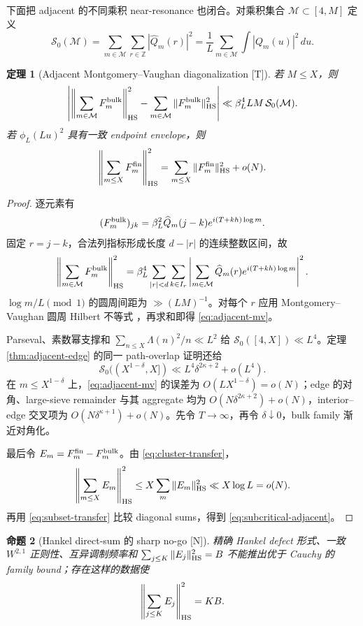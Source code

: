 \documentclass[UTF8,11pt,a4paper]{ctexart}
\newtheorem{theorem}{定理}[section]
\newtheorem{proposition}[theorem]{命题}
\theoremstyle{definition}
\theoremstyle{remark}
\begin{document}
下面把 adjacent 的不同乘积 near-resonance 也闭合。对乘积集合
$\mathcal M\subset[4,M]$ 定义
\[
 \mathcal S_0(\mathcal M)
 =\sum_{m\in\mathcal M}\sum_{r\in\mathbb Z}|\widehat Q_m(r)|^2
 =\frac1L\sum_{m\in\mathcal M}\int|Q_m(u)|^2\,du.
\]

\begin{theorem}[Adjacent Montgomery--Vaughan diagonalization {[T]}]
\label{thm:adjacent-mv}
若 $M\le X$，则
\[
 \left|
 \left\|\sum_{m\in\mathcal M}F_m^{\rm bulk}\right\|_{\rm HS}^2
 -\sum_{m\in\mathcal M}\|F_m^{\rm bulk}\|_{\rm HS}^2
 \right|
 \ll \beta_L^4LM\,\mathcal S_0(\mathcal M).
 \label{eq:adjacent-mv}
\]
若 $\phi_L(Lu)^2$ 具有一致 endpoint envelope，则
\[
 \left\|\sum_{m\le X}F_m^{\rm fin}\right\|_{\rm HS}^2
 =
 \sum_{m\le X}\|F_m^{\rm fin}\|_{\rm HS}^2+o(N).
 \label{eq:subcritical-adjacent}
\]
\end{theorem}

\begin{proof}
逐元素有
\[
 (F_m^{\rm bulk})_{jk}
 =\beta_L^2\widehat Q_m(j-k)e^{i(T+kh)\log m}.
\]
固定 $r=j-k$，合法列指标形成长度 $d-|r|$ 的连续整数区间，故
\[
 \left\|\sum_{m\in\mathcal M}F_m^{\rm bulk}\right\|_{\rm HS}^2
 =
 \beta_L^4\sum_{|r|<d}\sum_{k\in I_r}
 \left|\sum_{m\in\mathcal M}
 \widehat Q_m(r)e^{i(T+kh)\log m}\right|^2.
\]
$\log m/L\pmod1$ 的圆周间距为 $\gg(LM)^{-1}$。对每个 $r$ 应用
Montgomery--Vaughan 圆周 Hilbert 不等式 \cite{MV74}，再求和即得
\eqref{eq:adjacent-mv}。

Parseval、素数幂支撑和
$\sum_{n\le X}\Lambda(n)^2/n\ll L^2$ 给
$\mathcal S_0([4,X])\ll L^4$。定理 \ref{thm:adjacent-edge} 的同一
path-overlap 证明还给
\[
 \mathcal S_0((X^{1-\delta},X])
 \ll L^4\delta^{2\kappa+2}+o(L^4).
\]
在 $m\le X^{1-\delta}$ 上，\eqref{eq:adjacent-mv} 的误差为
$O(LX^{1-\delta})=o(N)$；edge 的对角、large-sieve remainder 与其
aggregate 均为 $O(N\delta^{2\kappa+2})+o(N)$，interior--edge 交叉项为
$O(N\delta^{\kappa+1})+o(N)$。先令 $T\to\infty$，再令
$\delta\downarrow0$，bulk family 渐近对角化。

最后令 $E_m=F_m^{\rm fin}-F_m^{\rm bulk}$。由
\eqref{eq:cluster-transfer}，
\[
 \left\|\sum_{m\le X}E_m\right\|_{\rm HS}^2
 \le X\sum_m\|E_m\|_{\rm HS}^2
 \ll X\log L=o(N).
\]
再用 \eqref{eq:subset-transfer} 比较 diagonal sums，得到
\eqref{eq:subcritical-adjacent}。
\end{proof}

\begin{proposition}[Hankel direct-sum 的 sharp no-go {[N]}]
\label{prop:hankel-family-nogo}
精确 Hankel defect 形式、一致 $W^{2,1}$ 正则性、互异调制频率和
$\sum_{j\le K}\|E_j\|_{\rm HS}^2=B$ 不能推出优于 Cauchy 的 family
bound；存在这样的数据使
\[
 \left\|\sum_{j\le K}E_j\right\|_{\rm HS}^2=KB.
\]
\end{proposition}
\end{document}
